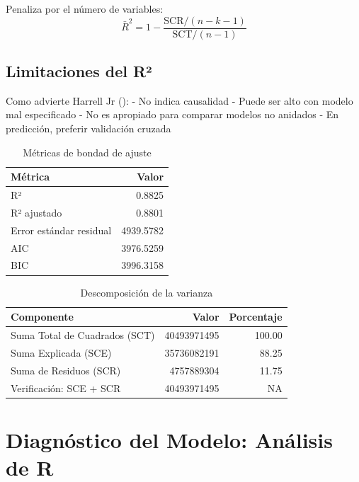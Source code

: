\documentclass[
  oneside]{book}
\begin{document}
Penaliza por el número de variables:
\begin{equation}
\bar{R}^2 = 1 - \frac{\text{SCR}/(n-k-1)}{\text{SCT}/(n-1)}
\end{equation}

\subsection{Limitaciones del R²}\label{limitaciones-del-ruxb2}

Como advierte Harrell Jr ():
- No indica causalidad
- Puede ser alto con modelo mal especificado
- No es apropiado para comparar modelos no anidados
- En predicción, preferir validación cruzada

\begin{table}
\centering
\caption{\label{tab:bondad-ajuste}Métricas de bondad de ajuste}
\centering
\begin{tabular}[t]{l|r}
\hline
Métrica & Valor\\
\hline
R² & 0.8825\\
\hline
R² ajustado & 0.8801\\
\hline
Error estándar residual & 4939.5782\\
\hline
AIC & 3976.5259\\
\hline
BIC & 3996.3158\\
\hline
\end{tabular}
\end{table}

\begin{table}
\centering
\caption{\label{tab:bondad-ajuste}Descomposición de la varianza}
\centering
\begin{tabular}[t]{l|r|r}
\hline
Componente & Valor & Porcentaje\\
\hline
Suma Total de Cuadrados (SCT) & 40493971495 & 100.00\\
\hline
Suma Explicada (SCE) & 35736082191 & 88.25\\
\hline
Suma de Residuos (SCR) & 4757889304 & 11.75\\
\hline
Verificación: SCE + SCR & 40493971495 & NA\\
\hline
\end{tabular}
\end{table}

\section{Diagnóstico del Modelo: Análisis de R}\label{diagnuxf3stico-del-modelo-anuxe1lisis-de-r}
\end{document}
